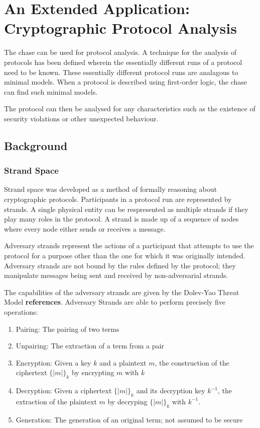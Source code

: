 \section{An Extended Application: \\ Cryptographic Protocol Analysis}

	The chase can be used for protocol analysis. A technique for the analysis
	of protocols has been defined wherein the essentially different runs of a
	protocol need to be known. These essentially different protocol runs are
	analagous to minimal models.  When a protocol is described using
	first-order logic, the chase can find such minimal models.

	The protocol can then be analysed for any characteristics such as the
	existence of security violations or other unexpected behaviour.

	\subsection{Background}

		\subsubsection{Strand Space}

			Strand space was developed as a method of formally reasoning about
			cryptographic protocols.  Participants in a protocol run are
			represented by strands. A single physical entity can be
			respresented as multiple strands if they play many roles in the
			protocol. A strand is made up of a sequence of nodes where every
			node either sends or receives a message.

			Adversary strands represent the actions of a participant that
			attempts to use the protocol for a purpose other than the one for
			which it was originally intended. Adversary strands are not bound
			by the rules defined by the protocol; they manipulate messages
			being sent and received by non-adversarial strands.

			The capabilities of the adversary strands are given by the
			Dolev-Yao Threat Model \textbf{references}. Adversary Strands are
			able to perform precisely five operations:

			\begin{enumerate}
			\item Pairing: The pairing of two terms
			\item Unpairing: The extraction of a term from a pair
			\item Encryption: Given a key $k$ and a plaintext $m$, the construction of the ciphertext $\{|m|\}_k$ by encrypting $m$ with $k$
			\item Decryption: Given a ciphertext $\{|m|\}_k$ and its decryption key $k^{-1}$, the extraction of the plaintext $m$ by decryping $\{|m|\}_k$ with $k^{-1}$.
			\item Generation: The generation of an original term; not assumed to be secure
			\end{enumerate}

